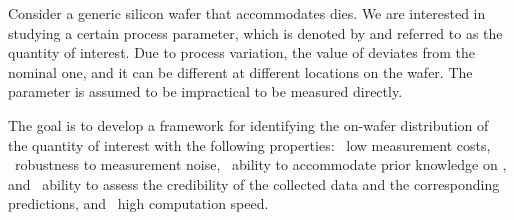 Consider a generic silicon wafer that accommodates \nd dies. We are interested
in studying a certain process parameter, which is denoted by \g and referred to
as the quantity of interest. Due to process variation, the value of \g deviates
from the nominal one, and it can be different at different locations on the
wafer. The parameter is assumed to be impractical to be measured directly.

The goal is to develop a framework for identifying the on-wafer distribution of
the quantity of interest \g with the following properties: \one~low measurement
costs, \two~robustness to measurement noise, \three~ability to accommodate prior
knowledge on \g, and \four~ability to assess the credibility of the collected
data and the corresponding predictions, and \five~high computation speed.
